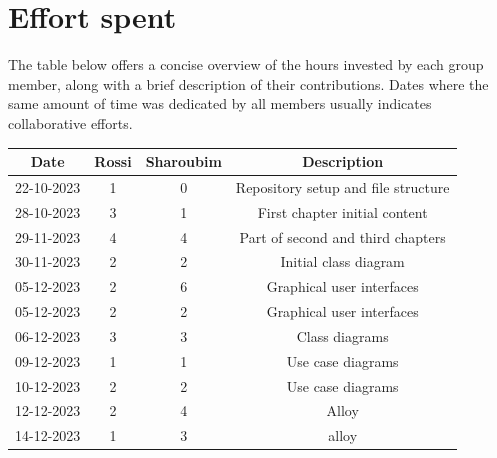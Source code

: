 \documentclass[12pt, a4paper]{report}
\begin{document}
\chapter{Effort spent}
    The table below offers a concise overview of the hours invested by each group member, along with a brief description of their contributions. 
    Dates where the same amount of time was dedicated by all members usually indicates collaborative efforts.
    \begin{table}[H]
        \centering
        \begin{tabular}{cccc}
            \textbf{Date}   & \textbf{Rossi}            & \textbf{Sharoubim}            & \textbf{Description}                          \\ \hline
            22-10-2023      & 1                         & 0                             & Repository setup and file structure           \\ 
            28-10-2023      & 3                         & 1                             & First chapter initial content                 \\ 
            29-11-2023      & 4                         & 4                             & Part of second and third chapters             \\
            30-11-2023      & 2                         & 2                             & Initial class diagram                         \\
            05-12-2023      & 2                         & 6                             & Graphical user interfaces                     \\
            05-12-2023      & 2                         & 2                             & Graphical user interfaces                     \\
            06-12-2023      & 3                         & 3                             & Class diagrams                                \\
            09-12-2023      & 1                         & 1                             & Use case diagrams                             \\
            10-12-2023      & 2                         & 2                             & Use case diagrams                             \\
            12-12-2023      & 2                         & 4                             & Alloy                                         \\
            14-12-2023      & 1                         & 3                             & alloy                                         \\

\end{tabular}
\end{table}
\end{document}
